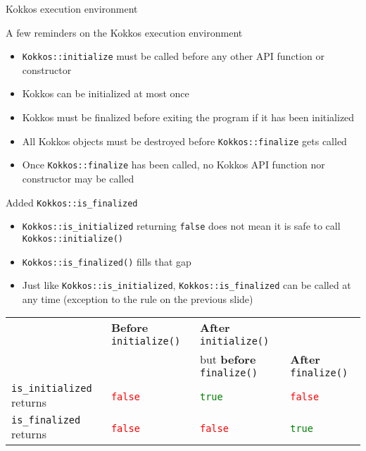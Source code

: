 

\begin{frame}[fragile]

        {\Huge Kokkos execution environment}

  \vspace{-20pt}

\end{frame}


\begin{frame}[fragile]{A few reminders on the Kokkos execution environment}
\begin{itemize}
\item \texttt{Kokkos::initialize} must be called before any other API function or constructor
\item Kokkos can be initialized at most once
\item Kokkos must be finalized before exiting the program if it has been initialized
\item All Kokkos objects must be destroyed before \texttt{Kokkos::finalize} gets called
\item Once \texttt{Kokkos::finalize} has been called, no Kokkos API function nor constructor may be called
\end{itemize}

\end{frame}


\begin{frame}[fragile]{Added \texttt{Kokkos::is\_finalized}}
\begin{itemize}
\item \texttt{Kokkos::is\_initialized} returning \texttt{false} does not mean it is safe to call \texttt{Kokkos::initialize()}
\item \texttt{Kokkos::is\_finalized()} fills that gap
\item Just like \texttt{Kokkos::is\_initialized}, \texttt{Kokkos::is\_finalized} can be called at any time (exception to the rule on the previous slide)
\end{itemize}

\vspace{2em}
\tiny
\begin{tabular}{llll}
 & \textbf{Before} \texttt{initialize()} & \textbf{After} \texttt{initialize()} \\
 &                                       & but \textbf{before} \texttt{finalize()}  & \textbf{After} \texttt{finalize()} \\
\texttt{is\_initialized} returns & \textcolor{red}{\texttt{false}} & \textcolor{green}{\texttt{true}} & \textcolor{red}{\texttt{false}} \\
\texttt{is\_finalized}   returns & \textcolor{red}{\texttt{false}} & \textcolor{red}{\texttt{false}} & \textcolor{green}{\texttt{true}}
\end{tabular}


\end{frame}

